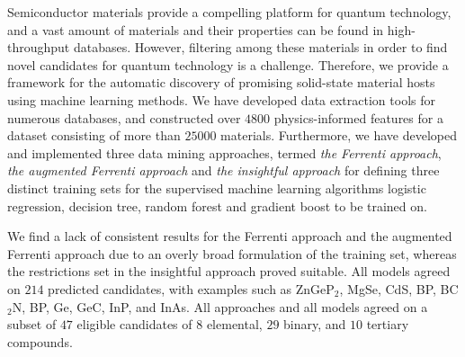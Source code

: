 Semiconductor materials provide a compelling platform for quantum technology, and a vast amount of materials and their properties can be found in high-throughput databases.
However, filtering among these materials in order to find novel candidates for quantum technology is a challenge. Therefore, we provide a framework for the automatic discovery of promising solid-state material hosts using machine learning methods.
We have developed data extraction tools for numerous databases, and constructed over $4800$ physics-informed features for a dataset consisting of more than $25000$ materials.
Furthermore, we have developed and implemented three data mining approaches, termed \textit{the Ferrenti approach}, \textit{the augmented Ferrenti approach} and \textit{the insightful approach} for defining three distinct training sets for the supervised machine learning algorithms logistic regression, decision tree, random forest and gradient boost to be trained on.

We find a lack of consistent results for the Ferrenti approach and the augmented Ferrenti approach due to an overly broad formulation of the training set, whereas the restrictions set in the insightful approach proved suitable. All models agreed on $214$ predicted candidates, with examples such as ZnGeP$_2$, MgSe, CdS, BP, BC$_2$N, BP, Ge, GeC, InP, and InAs. All approaches and all models agreed on a subset of $47$ eligible candidates of $8$ elemental, $29$ binary, and $10$ tertiary compounds.





